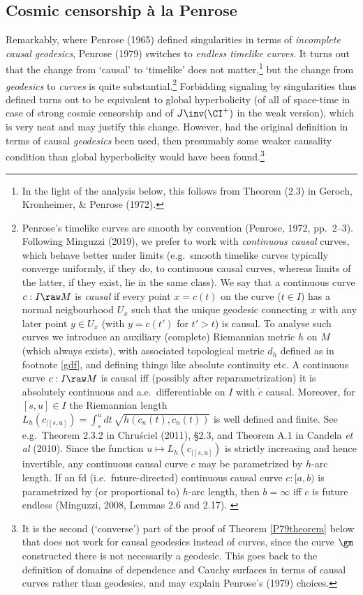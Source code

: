 \documentclass[12pt]{article}
\begin{document}
 \subsection{Cosmic censorship \`{a} la Penrose}\label{PCCC}
 Remarkably, where Penrose (1965) defined singularities in terms of  \emph{incomplete causal geodesics}, 
  Penrose (1979) switches to  \emph{endless timelike curves}. It turns out that the change from `causal' to `timelike' does not matter,\footnote{In the light of the analysis below, this follows from Theorem (2.3) in  Geroch, Kronheimer, \&  Penrose (1972).} but the change from \emph{geodesics} to   \emph{curves} is quite substantial.\footnote{Penrose's timelike curves  are smooth  by convention (Penrose, 1972, pp.\ 2--3). Following Minguzzi (2019),  we prefer to work with \emph{continuous causal} curves, which behave better under limits (e.g.\ smooth timelike curves typically converge 
  uniformly, if they do, to continuous causal curves, whereas limits of the latter, if they exist, lie in the same class). 
 We say that a continuous curve $c:I\raw M$ is \emph{causal} if every point $x=c(t)$ on the curve ($t\in I$) has a normal neigbourhood  $U_x$  such that the unique geodesic  connecting $x$ with
 any later point $y\in U_x$ (with $y=c(t')$ for $t'>t$)  is causal. To analyse such curves we introduce an auxiliary (complete)  Riemannian metric $h$ on $M$ (which always exists), 
with associated topological metric $d_h$ defined as in footnote \ref{gdf}, and defining things like absolute continuity etc.
 A continuous curve $c:I\raw M$ is causal iff (possibly after reparametrization) it is absolutely continuous and a.e.\ differentiable on $I$ with $\dot{c}$ causal. Moreover,  for $[s,u]\in I$ the Riemannian length
$L_h(c_{|[s,u]})=\int_s^udt\, \sqrt{h(\dot{c}_n(t), \dot{c}_n(t))}$ is well defined and finite.  See e.g.\ Theorem 2.3.2 in  Chru\'{s}ciel (2011), \S 2.3, and Theorem A.1 in Candela \emph{et al} (2010).
Since the function $u\mapsto L_h(c_{|[s,u]})$ is strictly increasing and hence invertible, 
any continuous causal curve $c$ may  be parametrized by $h$-arc length.  If an fd (i.e.\ future-directed) continuous causal curve $c:[a,b)$ is parametrized by (or proportional to) $h$-arc length, then $b=\infty$ iff $c$ is future endless (Minguzzi, 2008, Lemmas 2.6 and 2.17). \label{hfn}} 
  Forbidding signaling by singularities thus defined turns out to be equivalent to global hyperbolicity (of all of space-time in case of strong cosmic censorship and of $J\inv(\CI^+)$ in the weak version), which is very neat and may justify this change. However, had the original definition in terms of causal \emph{geodesics}  been used, then presumably some weaker causality condition than global hyperbolicity would have been found.\footnote{It is the second (`converse') part of the proof of Theorem \ref{P79theorem} below that does not work for causal  geodesics instead of  curves, since the curve $\gm$ constructed there is not necessarily a geodesic. This goes back to the definition of domains of dependence and  Cauchy surfaces in terms of causal curves rather than geodesics, and may explain Penrose's (1979) choices. 
 }
 
\end{document}
